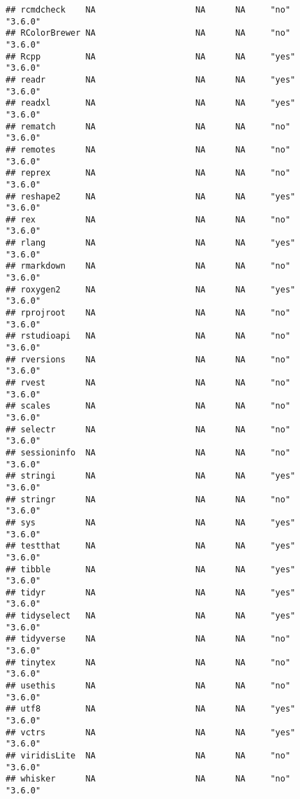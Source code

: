 \documentclass[]{book}
\begin{document}
\begin{verbatim}
## rcmdcheck    NA                    NA      NA     "no"             "3.6.0"
## RColorBrewer NA                    NA      NA     "no"             "3.6.0"
## Rcpp         NA                    NA      NA     "yes"            "3.6.0"
## readr        NA                    NA      NA     "yes"            "3.6.0"
## readxl       NA                    NA      NA     "yes"            "3.6.0"
## rematch      NA                    NA      NA     "no"             "3.6.0"
## remotes      NA                    NA      NA     "no"             "3.6.0"
## reprex       NA                    NA      NA     "no"             "3.6.0"
## reshape2     NA                    NA      NA     "yes"            "3.6.0"
## rex          NA                    NA      NA     "no"             "3.6.0"
## rlang        NA                    NA      NA     "yes"            "3.6.0"
## rmarkdown    NA                    NA      NA     "no"             "3.6.0"
## roxygen2     NA                    NA      NA     "yes"            "3.6.0"
## rprojroot    NA                    NA      NA     "no"             "3.6.0"
## rstudioapi   NA                    NA      NA     "no"             "3.6.0"
## rversions    NA                    NA      NA     "no"             "3.6.0"
## rvest        NA                    NA      NA     "no"             "3.6.0"
## scales       NA                    NA      NA     "no"             "3.6.0"
## selectr      NA                    NA      NA     "no"             "3.6.0"
## sessioninfo  NA                    NA      NA     "no"             "3.6.0"
## stringi      NA                    NA      NA     "yes"            "3.6.0"
## stringr      NA                    NA      NA     "no"             "3.6.0"
## sys          NA                    NA      NA     "yes"            "3.6.0"
## testthat     NA                    NA      NA     "yes"            "3.6.0"
## tibble       NA                    NA      NA     "yes"            "3.6.0"
## tidyr        NA                    NA      NA     "yes"            "3.6.0"
## tidyselect   NA                    NA      NA     "yes"            "3.6.0"
## tidyverse    NA                    NA      NA     "no"             "3.6.0"
## tinytex      NA                    NA      NA     "no"             "3.6.0"
## usethis      NA                    NA      NA     "no"             "3.6.0"
## utf8         NA                    NA      NA     "yes"            "3.6.0"
## vctrs        NA                    NA      NA     "yes"            "3.6.0"
## viridisLite  NA                    NA      NA     "no"             "3.6.0"
## whisker      NA                    NA      NA     "no"             "3.6.0"

\end{verbatim}
\end{document}
